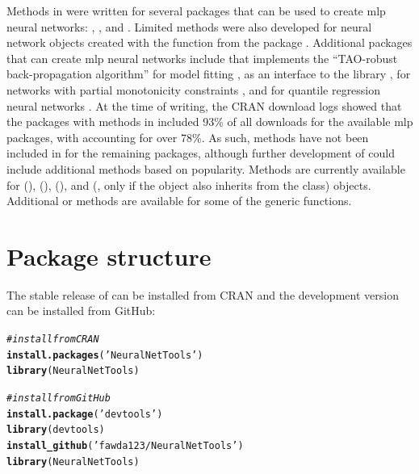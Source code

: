 \documentclass[article,shortnames]{jss}\usepackage[]{graphicx}\usepackage[]{color}
\makeatletter
\newcommand{\hlstr}[1]{\textcolor[rgb]{0.192,0.494,0.8}{#1}}%
\newcommand{\hlcom}[1]{\textcolor[rgb]{0.678,0.584,0.686}{\textit{#1}}}%
\newcommand{\hlstd}[1]{\textcolor[rgb]{0.345,0.345,0.345}{#1}}%
\newcommand{\hlkwd}[1]{\textcolor[rgb]{0.737,0.353,0.396}{\textbf{#1}}}%
\newenvironment{kframe}{%
 \def\at@end@of@kframe{}%
 \ifinner\ifhmode%
  \def\at@end@of@kframe{\end{minipage}}%
  \begin{minipage}{\columnwidth}%
 \fi\fi%
 \def\FrameCommand##1{\hskip\@totalleftmargin \hskip-\fboxsep
 \colorbox{shadecolor}{##1}\hskip-\fboxsep
     \hskip-\linewidth \hskip-\@totalleftmargin \hskip\columnwidth}%
 \MakeFramed {\advance\hsize-\width
   \@totalleftmargin\z@ \linewidth\hsize
   \@setminipage}}%
 {\par\unskip\endMakeFramed%
 \at@end@of@kframe}
\makeatother
\begin{document}
Methods in  were written for several  packages that can be used to create \ac{mlp} neural networks:  \citep{Fritsch12},  \citep{Venables02}, and  \citep{Bergmeir12}. Limited methods were also developed for neural network objects created with the  function from the  package \citep{Kuhn15}.  Additional  packages that can create \ac{mlp} neural networks include  that implements the ``TAO-robust back-propagation algorithm'' for model fitting \citep{Castejon14},  as an  interface to the   library \citep{Klima15},  for networks with partial monotonicity constraints \citep{Cannon15}, and  for quantile regression neural networks \citep{Cannon11}.  At the time of writing, the \ac{CRAN} download logs \citep{Csardi15} showed that the  packages with methods in  included 93\% of all downloads for the available \ac{mlp} packages, with  accounting for over 78\%.  As such, methods have not been included in  for the remaining packages, although further development of  could include additional methods based on popularity.  Methods are currently available for   (),  (),  (), and  (, only if the object also inherits from the  class) objects.  Additional  or  methods are available for some of the generic functions.

\section[Package structure]{Package structure}

The stable release of  can be installed from \ac{CRAN} and the development version can be installed from GitHub:

\begin{kframe}
\begin{alltt}
\hlcom{# install from CRAN}
\hlkwd{install.packages}\hlstd{(}\hlstr{'NeuralNetTools'}\hlstd{)}
\hlkwd{library}\hlstd{(NeuralNetTools)}

\hlcom{# install from GitHub}
\hlkwd{install.package}\hlstd{(}\hlstr{'devtools'}\hlstd{)}
\hlkwd{library}\hlstd{(devtools)}
\hlkwd{install_github}\hlstd{(}\hlstr{'fawda123/NeuralNetTools'}\hlstd{)}
\hlkwd{library}\hlstd{(NeuralNetTools)}
\end{alltt}
\end{kframe}
\end{document}
